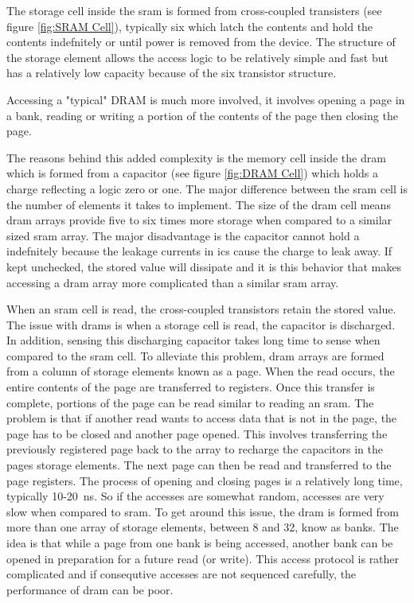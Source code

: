 The storage cell inside the \ac{sram} is formed from cross-coupled transisters (see figure \ref{fig:SRAM Cell}), typically six which latch the contents and hold the contents indefnitely or until power is removed from the device.
The structure of the storage element allows the access logic to be relatively simple and fast but has a relatively low capacity because of the six transistor structure.

Accessing a "typical" DRAM is much more involved, it involves opening a page in a bank, reading or writing a portion of the contents of the page then closing the page. 

The reasons behind this added complexity is the memory cell inside the \ac{dram} which is formed from a capacitor (see figure \ref{fig:DRAM Cell}) which holds a charge reflecting a logic zero or one. 
The major difference between the \ac{sram} cell is the number of elements it takes to implement. The size of the \ac{dram} cell means \ac{dram} arrays provide five to six times more storage when compared to a similar sized \ac{sram} array.
The major disadvantage is the capacitor cannot hold a indefnitely because the leakage currents in \acp{ic} cause the charge to leak away. If kept unchecked, the stored value will dissipate and it is this behavior that makes accessing a \ac{dram} array more complicated than a similar \ac{sram} array.

When an \ac{sram} cell is read, the cross-coupled transistors retain the stored value. The issue with \acp{dram} is when a storage cell is read, the capacitor is discharged. In addition, sensing this discharging capacitor takes long time to sense when compared to the \ac{sram} cell.
To alleviate this problem, \ac{dram} arrays are formed from a column of storage elements known as a page. When the read occurs, the entire contents of the page are transferred to registers. Once this transfer is complete, portions of the page can be read similar to reading an \ac{sram}. 
The problem is that if another read wants to access data that is not in the page, the page has to be closed and another page opened. This involves transferring the previously registered page back to the array to recharge the capacitors in the pages storage elements. The next page can then be read and transferred to the page registers.
The process of opening and closing pages is a relatively long time, typically 10-20\SI[per-mode=symbol]{}{\nano\second}. So if the accesses are somewhat random, accesses are very slow when compared to \ac{sram}.
To get around this issue, the \ac{dram} is formed from more than one array of storage elements, between 8 and 32, know as banks. The idea is that while a page from one bank is being accessed, another bank can be opened in preparation for a future read (or write).
This access protocol is rather complicated and if consequtive accesses are not sequenced carefully, the performance of \ac{dram} can be poor.

